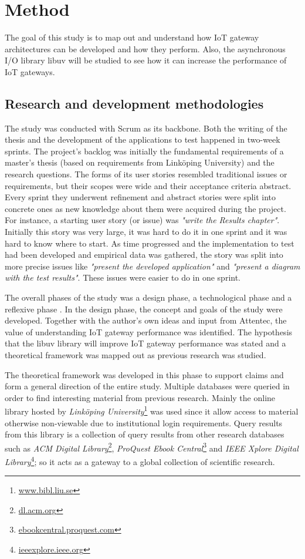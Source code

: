 \chapter{Method}
\label{cha:method}

The goal of this study is to map out and understand how IoT gateway
architectures can be developed and how they perform. Also, the asynchronous I/O
library libuv will be studied to see how it can increase the performance of IoT
gateways.

\section{Research and development methodologies}

The study was conducted with Scrum as its backbone. Both the writing of the
thesis and the development of the applications to test happened in two-week
sprints. The project's backlog was initially the fundamental requirements of a
master's thesis (based on requirements from Linköping University) and the
research questions. The forms of its user stories resembled traditional issues
or requirements, but their scopes were wide and their acceptance criteria
abstract. Every sprint they underwent refinement and abstract stories were
split into concrete ones as new knowledge about them were acquired during the
project. For instance, a starting user story (or issue) was \textit{"write the
Results chapter"}. Initially this story was very large, it was hard to do it in
one sprint and it was hard to know where to start. As time progressed and the
implementation to test had been developed and empirical data was gathered, the
story was split into more precise issues like \textit{"present the developed
application"} and \textit{"present a diagram with the test results"}. These
issues were easier to do in one sprint.

The overall phases of the study was a design phase, a technological phase
and a reflexive phase \cite{novikov2013research}. In the design phase, the
concept and goals of the study were developed. Together with the author's own
ideas and input from Attentec, the value of understanding IoT gateway
performance was identified. The hypothesis that the libuv library will improve
IoT gateway performance was stated and a theoretical framework was mapped out
as previous research was studied.

The theoretical framework was developed in this phase to support claims and
form a general direction of the entire study. Multiple databases were queried
in order to find interesting material from previous research. Mainly the online
library hosted by \textit{Linköping University}\footnote{\url{www.bibl.liu.se}}
was used since it allow access to material otherwise non-viewable due to
institutional login requirements. Query results from this library is a
collection of query results from other research databases such as \textit{ACM
Digital Library}\footnote{\url{dl.acm.org}}, \textit{ProQuest Ebook
Central}\footnote{\url{ebookcentral.proquest.com}} and \textit{IEEE Xplore
Digital Library}\footnote{\url{ieeexplore.ieee.org}}; so it acts as a gateway
to a global collection of scientific research.

